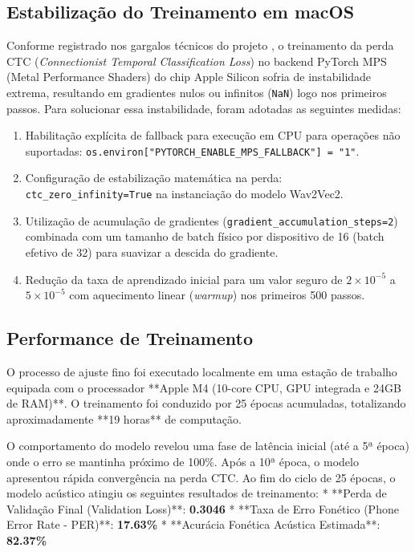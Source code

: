 \documentclass[12pt]{article}
\begin{document}
\subsection{Estabilização do Treinamento em macOS}
Conforme registrado nos gargalos técnicos do projeto \cite{techchallenges}, o treinamento da perda CTC (\textit{Connectionist Temporal Classification Loss}) no backend PyTorch MPS (Metal Performance Shaders) do chip Apple Silicon sofria de instabilidade extrema, resultando em gradientes nulos ou infinitos (\texttt{NaN}) logo nos primeiros passos. Para solucionar essa instabilidade, foram adotadas as seguintes medidas:
\begin{enumerate}
    \item Habilitação explícita de fallback para execução em CPU para operações não suportadas: \texttt{os.environ["PYTORCH\_ENABLE\_MPS\_FALLBACK"] = "1"}.
    \item Configuração de estabilização matemática na perda: \texttt{ctc\_zero\_infinity=True} na instanciação do modelo Wav2Vec2.
    \item Utilização de acumulação de gradientes (\texttt{gradient\_accumulation\_steps=2}) combinada com um tamanho de batch físico por dispositivo de 16 (batch efetivo de 32) para suavizar a descida do gradiente.
    \item Redução da taxa de aprendizado inicial para um valor seguro de $2 \times 10^{-5}$ a $5 \times 10^{-5}$ com aquecimento linear (\textit{warmup}) nos primeiros 500 passos.
\end{enumerate}

\subsection{Performance de Treinamento}
O processo de ajuste fino foi executado localmente em uma estação de trabalho equipada com o processador **Apple M4 (10-core CPU, GPU integrada e 24GB de RAM)**. O treinamento foi conduzido por 25 épocas acumuladas, totalizando aproximadamente **19 horas** de computação.

O comportamento do modelo revelou uma fase de latência inicial (até a 5ª época) onde o erro se mantinha próximo de 100\%. Após a 10ª época, o modelo apresentou rápida convergência na perda CTC. Ao fim do ciclo de 25 épocas, o modelo acústico atingiu os seguintes resultados de treinamento:
* **Perda de Validação Final (Validation Loss)**: \textbf{0.3046}
* **Taxa de Erro Fonético (Phone Error Rate - PER)**: \textbf{17.63\%}
* **Acurácia Fonética Acústica Estimada**: \textbf{82.37\%}
\end{document}
